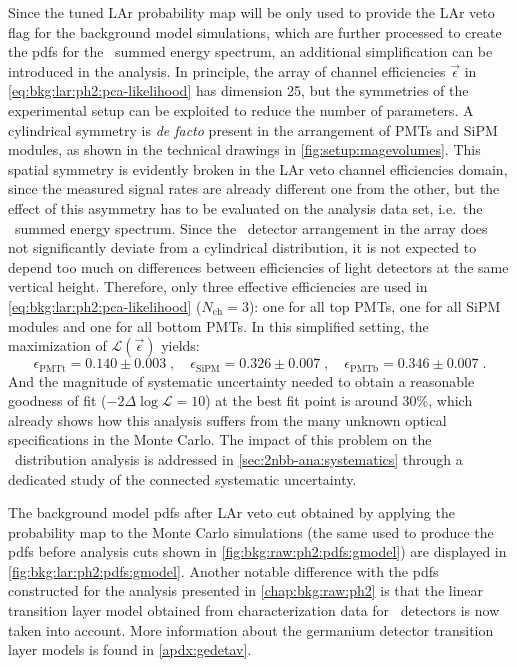 Since the tuned LAr probability map will be only used to provide the LAr veto flag for the
background model simulations, which are further processed to create the pdfs for the
\bege\ summed energy spectrum, an additional simplification can be introduced in the
analysis. In principle, the array of channel efficiencies $\vec{\epsilon}$ in
\cref{eq:bkg:lar:ph2:pca-likelihood} has dimension 25, but the symmetries of the
experimental setup can be exploited to reduce the number of parameters. A cylindrical
symmetry is \emph{de facto} present in the arrangement of PMTs and SiPM modules, as shown
in the technical drawings in \cref{fig:setup:magevolumes}. This spatial symmetry is evidently
broken in the LAr veto channel efficiencies domain, since the measured signal rates are
already different one from the other, but the effect of this asymmetry has to be evaluated
on the analysis data set, i.e.~the \bege\ summed energy spectrum. Since the \bege\
detector arrangement in the array does not significantly deviate from a cylindrical
distribution, it is not expected to depend too much on differences between efficiencies of
light detectors at the same vertical height. Therefore, only three effective efficiencies
are used in \cref{eq:bkg:lar:ph2:pca-likelihood} ($N_\text{ch}=3$): one for all top PMTs,
one for all SiPM modules and one for all bottom PMTs.
\newpar
In this simplified setting, the maximization of $\mathcal{L}(\vec{\epsilon})$ yields:
\begin{equation}\label{eq:bkg:lar:ph2:chan-eff}
  \epsilon_\text{PMTt} = 0.140 \pm 0.003 \;, \quad
  \epsilon_\text{SiPM} = 0.326 \pm 0.007 \;, \quad
  \epsilon_\text{PMTb} = 0.346 \pm 0.007 \;.
\end{equation}
And the magnitude of systematic uncertainty needed to obtain a reasonable goodness of fit
($-2\Delta\log\mathcal{L}=10$) at the best fit point is around 30\%, which already shows
how this analysis suffers from the many unknown optical specifications in the Monte Carlo.
The impact of this problem on the \nnbb\ distribution analysis is addressed in
\cref{sec:2nbb-ana:systematics} through a dedicated study of the connected systematic
uncertainty.

The background model pdfs after LAr veto cut obtained by applying the probability map to
the Monte Carlo simulations (the same used to produce the pdfs before analysis cuts shown
in \cref{fig:bkg:raw:ph2:pdfs:gmodel}) are displayed in
\cref{fig:bkg:lar:ph2:pdfs:gmodel}. Another notable difference with the pdfs constructed
for the analysis presented in \cref{chap:bkg:raw:ph2} is that the linear transition layer
model obtained from characterization data for \bege\ detectors \cite{Lehnert2016} is now
taken into account. More information about the germanium detector transition layer models
is found in \cref{apdx:gedetav}. \fillme{any other comment?}

